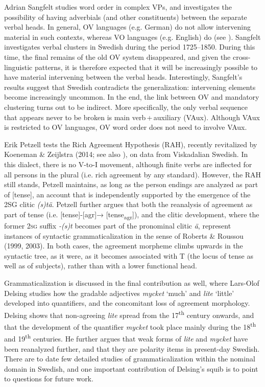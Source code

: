 \documentclass[output=paper]{langscibook}
\begin{document}
Adrian Sangfelt studies word order in complex VPs, and investigates the possibility of having adverbials (and other constituents) between the separate verbal heads. In general, OV languages (e.g. German) do not allow intervening material in such contexts, whereas VO languages (e.g. English) do (see \citealt{Haider2010,Haider2013}). Sangfelt investigates verbal clusters in Swedish during the period 1725–1850. During this time, the final remains of the old OV system disappeared, and given the cross-linguistic patterns, it is therefore expected that it will be increasingly possible to have material intervening between the verbal heads. Interestingly, Sangfelt’s results suggest that Swedish contradicts the generalization: intervening elements become increasingly uncommon. In the end, the link between OV and mandatory clustering turns out to be indirect. More specifically, the only verbal sequence that appears never to be broken is main verb\,+\,auxiliary (VAux). Although VAux is restricted to OV languages, OV word order does not need to involve VAux.



Erik Petzell tests the Rich Agreement Hypothesis (RAH), recently revitalized by Koeneman \& Zeijlstra (2014; see also \citealt{Tvica2017}), on data from Viskadalian Swedish. In this dialect, there is no V-to-I movement, although finite verbs are inflected for all persons in the plural (i.e. rich agreement by any standard). However, the RAH still stands, Petzell maintains, as long as the person endings are analyzed as part of [tense], an account that is independently supported by the emergence of the 2SG clitic \textit{(s)tä}. Petzell further argues that both the reanalysis of agreement as part of tense (i.e. [tense]-[agr]→ [tense\textsubscript{agr}]), and the clitic development, where the former \textsc{2sg} suffix \textit{{}-(s)t} becomes part of the pronominal clitic \textit{ä}, represent instances of syntactic grammaticalization in the sense of Roberts \& Roussou (1999, 2003). In both cases, the agreement morpheme climbs upwards in the syntactic tree, as it were, as it becomes associated with T (the locus of tense as well as of subjects), rather than with a lower functional head.



Grammaticalization is discussed in the final contribution as well, where Lars-Olof Delsing studies how the gradable adjectives \textit{mycket} ‘much’ and \textit{lite} ‘little’ developed into quantifiers, and the concomitant loss of agreement morphology. Delsing shows that non-agreeing \textit{lite} spread from the 17\textsuperscript{th} century onwards, and that the development of the quantifier \textit{mycket} took place mainly during the 18\textsuperscript{th} and 19\textsuperscript{th} centuries. He further argues that weak forms of \textit{lite} and \textit{mycket} have been reanalyzed further, and that they are polarity items in present-day Swedish. There are to date few detailed studies of grammaticalization within the nominal domain in Swedish, and one important contribution of Delsing’s squib is to point to questions for future work.
\end{document}
